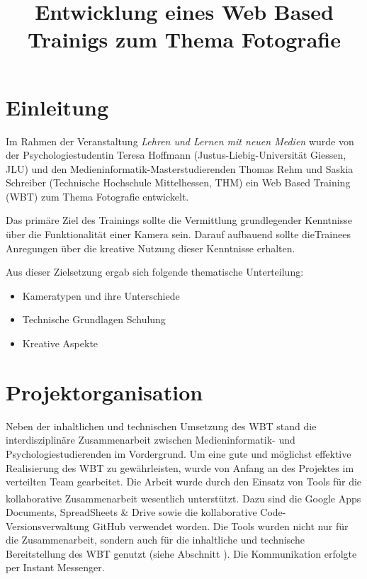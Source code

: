 \documentclass{article}
\title{Entwicklung eines Web Based Trainigs zum Thema Fotografie}
\begin{document}
\maketitle

\section{Einleitung}
\label{sec:intro}

Im Rahmen der Veranstaltung \emph{Lehren und Lernen mit neuen Medien} wurde von der Psychologiestudentin Teresa Hoffmann (Justus-Liebig-Universit\"at Giessen, JLU) und den Medieninformatik-Masterstudierenden Thomas Rehm und Saskia Schreiber (Technische Hochschule Mittelhessen, THM) ein Web Based Training (WBT) zum Thema Fotografie entwickelt.

Das prim\"are Ziel des Trainings sollte die Vermittlung grundlegender Kenntnisse \"uber die Funktionalit\"at einer Kamera sein. Darauf aufbauend sollte dieTrainees Anregungen \"uber die kreative Nutzung dieser Kenntnisse erhalten.

Aus dieser Zielsetzung ergab sich folgende thematische Unterteilung:

\begin{itemize}
\item Kameratypen und ihre Unterschiede
\item Technische Grundlagen Schulung
\item Kreative Aspekte

\end{itemize}

\section{Projektorganisation}
\label{sec:orga}
Neben der inhaltlichen und technischen Umsetzung des WBT stand die interdisziplin\"are Zusammenarbeit zwischen Medieninformatik- und Psychologiestudierenden im Vordergrund. Um eine gute und m\"oglichst effektive Realisierung des WBT zu gew\"ahrleisten, wurde von Anfang an des Projektes im verteilten Team gearbeitet. Die Arbeit wurde durch den Einsatz von Tools f\"ur die kollaborative Zusammenarbeit wesentlich unterst\"utzt. Dazu sind die Google\textsuperscript{\textcopyright} Apps Documents, SpreadSheets \& Drive sowie die kollaborative Code-Versionsverwaltung GitHub verwendet worden. Die Tools wurden nicht nur f\"ur die Zusammenarbeit, sondern auch f\"ur die inhaltliche und technische Bereitstellung des WBT genutzt (siehe Abschnitt ). Die Kommunikation erfolgte per Instant Messenger.
\end{document}

